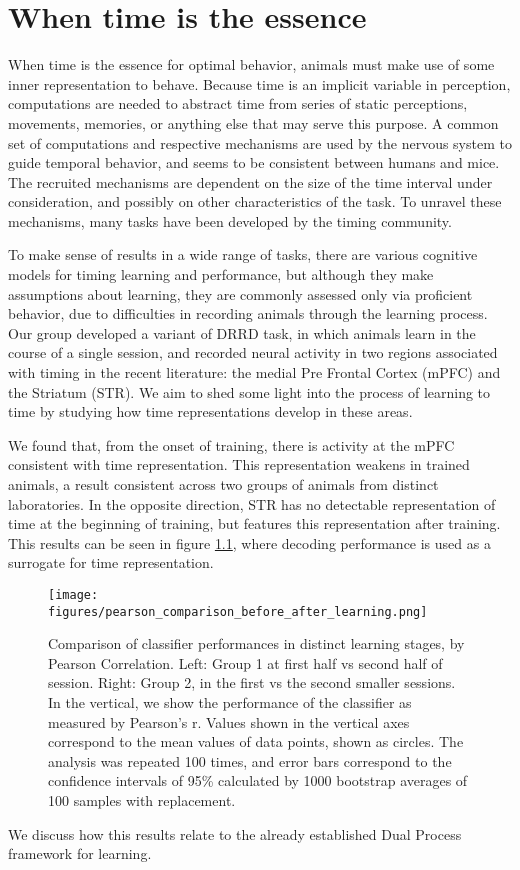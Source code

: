 \chapter{When time is the essence}

When time is the essence for optimal behavior, animals must make use of some inner representation to behave. Because time is an implicit variable in perception, computations are needed to abstract time from series of static perceptions, movements, memories, or anything else that may serve this purpose. A common set of computations and respective mechanisms are used by the nervous system to guide temporal behavior, and seems to be consistent between humans and mice. The recruited mechanisms are dependent on the size of the time interval under consideration, and possibly on other characteristics of the task. To unravel these mechanisms, many tasks have been developed by the timing community.

To make sense of results in a wide range of tasks, there are various cognitive models for timing learning and performance, but although they make assumptions about learning, they are commonly assessed only via proficient behavior, due to difficulties in recording animals through the learning process. Our group developed a variant of DRRD task, in which animals learn in the course of a single session, and recorded neural activity in two regions associated with timing in the recent literature: the medial Pre Frontal Cortex (mPFC) and the Striatum (STR). We aim to shed some light into the process of learning to time by studying how time representations develop in these areas.

We found that, from the onset of training, there is activity at the mPFC consistent with time representation. This representation weakens in trained animals, a result consistent across two groups of animals from distinct laboratories. In the opposite direction, STR has no detectable representation of time at the beginning of training, but features this representation after training. This results can be seen in figure \ref{fig:time_representation_str_pfc}, where decoding performance is used as a surrogate for time representation.

\begin{figure}
    \centering
    \texttt{[image: figures/pearson\_comparison\_before\_after\_learning.png]}
    \caption[Comparison of classifier performances in distinct learning stages, by Pearson Correlation]{Comparison of classifier performances in distinct learning stages, by Pearson Correlation. Left: Group 1 at first half vs second half of session. Right: Group 2, in the first vs the second smaller sessions. In the vertical, we show the performance of the classifier as measured by Pearson's r. Values shown in the vertical axes correspond to the mean values of data points, shown as circles. The analysis was repeated 100 times, and error bars correspond to the confidence intervals of 95\% calculated by 1000 bootstrap averages of 100 samples with replacement.}
    \label{fig:time_representation_str_pfc}
\end{figure}
We discuss how this results relate to the already established Dual Process framework for learning.


